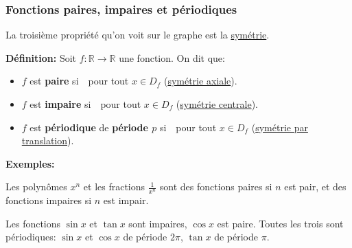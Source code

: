 \documentclass[10pt]{beamer}
\newcommand{\bitem}{\item[$\bullet$]}
\newcommand{\R}{\mathbb R}
\begin{document}
\begin{frame}
\frametitle{\bf Fonctions paires, impaires et p\'eriodiques}
\medskip 

{\small 
La troisi\`eme propri\'et\'e qu'on voit sur le graphe est la 
\underline{sym\'etrie}.}
\vspace*{2mm}

{\bf D\'efinition:} 
Soit $f:\R\rightarrow\R$ une fonction. On dit que: 
\vspace*{1mm}

\begin{itemize}
\bitem
\parbox[t]{6cm}{
$f$ est {\bf paire} si\ \ pour tout 
$x\!\in\! D_f$ (\underline{sym\'etrie axiale}).}
\quad
\raisebox{-.8\height}{\pair}
\vspace*{1mm}

\bitem
\parbox[t]{6cm}{
$f$ est {\bf impaire} si\ \ pour tout 
$x\!\in\! D_f$ (\underline{sym\'etrie centrale}).}
\quad
\raisebox{-.8\height}{\impair} 
\vspace*{1mm}

\bitem
\parbox[t]{5.5cm}{
$f$ est {\bf p\'eriodique} de {\bf p\'eriode $p$} si\ 
\ pour tout $x\!\in\! D_f$
(\underline{sym\'etrie par translation}).}
\quad
\raisebox{-.8\height}{\periodique} 
\end{itemize} 
\vspace*{0.5mm}

\pause
{\small 
{\bf Exemples:}
\begin{itemize}
\parbox{10cm}{
\bitem
Les polyn\^omes $x^n$ et les fractions $\frac{1}{x^n}$ sont des fonctions 
paires si $n$ est pair, et des fonctions impaires si $n$ est impair.}  
\parbox{10cm}{
\bitem
Les fonctions $\sin x$ et $\tan x$ sont impaires, $\cos x$ est paire. 
Toutes les trois sont p\'eriodiques: $\sin x$ et $\cos x$ de p\'eriode $2\pi$, 
$\tan x$ de p\'eriode $\pi$.}
\end{itemize} 

}

\end{frame}

\end{document}
